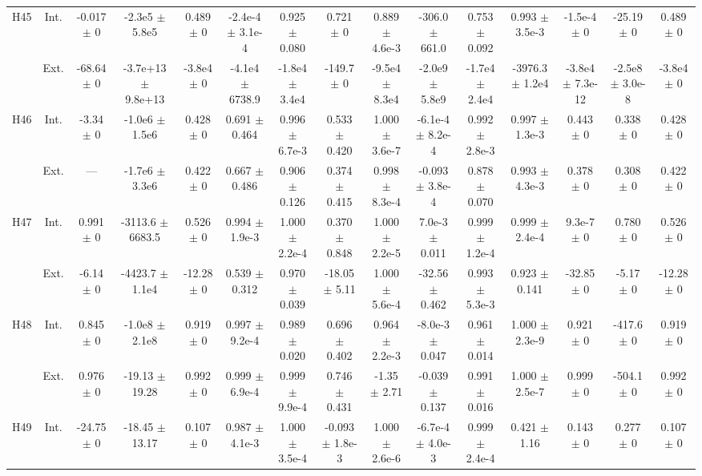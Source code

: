 \begin{table}[htbp]
{\begin{tabular}{@{}ccccccccccccccc@{}}
\cline{2-15}
\multirow{2}{*}{H45} & Int. & -0.017 $\pm$ 0 & -2.3e5 $\pm$ 5.8e5 & 0.489 $\pm$ 0 & -2.4e-4 $\pm$ 3.1e-4 & 0.925 $\pm$ 0.080 & 0.721 $\pm$ 0 & 0.889 $\pm$ 4.6e-3 & -306.0 $\pm$ 661.0 & 0.753 $\pm$ 0.092 & 0.993 $\pm$ 3.5e-3 & -1.5e-4 $\pm$ 0 & -25.19 $\pm$ 0 & 0.489 $\pm$ 0 \\
 & Ext. & -68.64 $\pm$ 0 & -3.7e+13 $\pm$ 9.8e+13 & -3.8e4 $\pm$ 0 & -4.1e4 $\pm$ 6738.9 & -1.8e4 $\pm$ 3.4e4 & -149.7 $\pm$ 0 & -9.5e4 $\pm$ 8.3e4 & -2.0e9 $\pm$ 5.8e9 & -1.7e4 $\pm$ 2.4e4 & -3976.3 $\pm$ 1.2e4 & -3.8e4 $\pm$ 7.3e-12 & -2.5e8 $\pm$ 3.0e-8 & -3.8e4 $\pm$ 0 \\
\cline{2-15}
\multirow{2}{*}{H46} & Int. & -3.34 $\pm$ 0 & -1.0e6 $\pm$ 1.5e6 & 0.428 $\pm$ 0 & 0.691 $\pm$ 0.464 & 0.996 $\pm$ 6.7e-3 & 0.533 $\pm$ 0.420 & 1.000 $\pm$ 3.6e-7 & -6.1e-4 $\pm$ 8.2e-4 & 0.992 $\pm$ 2.8e-3 & 0.997 $\pm$ 1.3e-3 & 0.443 $\pm$ 0 & 0.338 $\pm$ 0 & 0.428 $\pm$ 0 \\
 & Ext. & --- & -1.7e6 $\pm$ 3.3e6 & 0.422 $\pm$ 0 & 0.667 $\pm$ 0.486 & 0.906 $\pm$ 0.126 & 0.374 $\pm$ 0.415 & 0.998 $\pm$ 8.3e-4 & -0.093 $\pm$ 3.8e-4 & 0.878 $\pm$ 0.070 & 0.993 $\pm$ 4.3e-3 & 0.378 $\pm$ 0 & 0.308 $\pm$ 0 & 0.422 $\pm$ 0 \\
\cline{2-15}
\multirow{2}{*}{H47} & Int. & 0.991 $\pm$ 0 & -3113.6 $\pm$ 6683.5 & 0.526 $\pm$ 0 & 0.994 $\pm$ 1.9e-3 & 1.000 $\pm$ 2.2e-4 & 0.370 $\pm$ 0.848 & 1.000 $\pm$ 2.2e-5 & 7.0e-3 $\pm$ 0.011 & 0.999 $\pm$ 1.2e-4 & 0.999 $\pm$ 2.4e-4 & 9.3e-7 $\pm$ 0 & 0.780 $\pm$ 0 & 0.526 $\pm$ 0 \\
 & Ext. & -6.14 $\pm$ 0 & -4423.7 $\pm$ 1.1e4 & -12.28 $\pm$ 0 & 0.539 $\pm$ 0.312 & 0.970 $\pm$ 0.039 & -18.05 $\pm$ 5.11 & 1.000 $\pm$ 5.6e-4 & -32.56 $\pm$ 0.462 & 0.993 $\pm$ 5.3e-3 & 0.923 $\pm$ 0.141 & -32.85 $\pm$ 0 & -5.17 $\pm$ 0 & -12.28 $\pm$ 0 \\
\cline{2-15}
\multirow{2}{*}{H48} & Int. & 0.845 $\pm$ 0 & -1.0e8 $\pm$ 2.1e8 & 0.919 $\pm$ 0 & 0.997 $\pm$ 9.2e-4 & 0.989 $\pm$ 0.020 & 0.696 $\pm$ 0.402 & 0.964 $\pm$ 2.2e-3 & -8.0e-3 $\pm$ 0.047 & 0.961 $\pm$ 0.014 & 1.000 $\pm$ 2.3e-9 & 0.921 $\pm$ 0 & -417.6 $\pm$ 0 & 0.919 $\pm$ 0 \\
 & Ext. & 0.976 $\pm$ 0 & -19.13 $\pm$ 19.28 & 0.992 $\pm$ 0 & 0.999 $\pm$ 6.9e-4 & 0.999 $\pm$ 9.9e-4 & 0.746 $\pm$ 0.431 & -1.35 $\pm$ 2.71 & -0.039 $\pm$ 0.137 & 0.991 $\pm$ 0.016 & 1.000 $\pm$ 2.5e-7 & 0.999 $\pm$ 0 & -504.1 $\pm$ 0 & 0.992 $\pm$ 0 \\
\cline{2-15}
\multirow{2}{*}{H49} & Int. & -24.75 $\pm$ 0 & -18.45 $\pm$ 13.17 & 0.107 $\pm$ 0 & 0.987 $\pm$ 4.1e-3 & 1.000 $\pm$ 3.5e-4 & -0.093 $\pm$ 1.8e-3 & 1.000 $\pm$ 2.6e-6 & -6.7e-4 $\pm$ 4.0e-3 & 0.999 $\pm$ 2.4e-4 & 0.421 $\pm$ 1.16 & 0.143 $\pm$ 0 & 0.277 $\pm$ 0 & 0.107 $\pm$ 0 \\

\end{tabular}}
\end{table}
